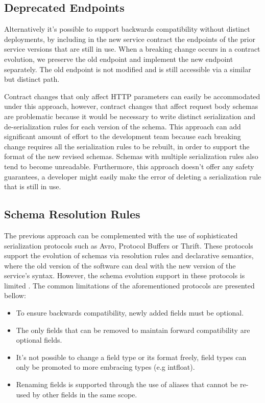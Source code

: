 \subsection{Deprecated Endpoints} %
\label{sec:deprecated_endpoints}

Alternatively it's possible to support backwards compatibility without distinct deployments,
by including in the new service contract the endpoints of the prior service versions that are still in use.
When a breaking change occurs in a contract evolution, we preserve the old endpoint and implement the new endpoint separately.
The old endpoint is not modified and is still accessible via a similar but distinct path.

Contract changes that only affect HTTP parameters can easily be accommodated under this approach, however, contract changes that affect
request body schemas are problematic because it would be necessary to write distinct serialization and de-serialization rules for each version of the schema.
This approach can add significant amount of effort to the development team because each breaking change requires all the serialization rules to be rebuilt,
in order to support the format of the new revised schemas.
Schemas with multiple serialization rules also tend to become unreadable.
Furthermore, this approach doesn't offer any safety guarantees,
a developer might easily make the error of deleting a serialization rule that is still in use.

\subsection{Schema Resolution Rules} %
\label{sec:schema_resolution_rules}

The previous approach can be complemented with the use of sophisticated serialization protocols such as Avro, Protocol Buffers or Thrift.
These protocols support the evolution of schemas via resolution rules and declarative semantics,
where the old version of the software can deal with the new version of the service’s syntax.
However, the schema evolution support in these protocols is limited \cite{11}.
The common limitations of the aforementioned protocols are presented bellow:

\begin{itemize}
    \item To ensure backwards compatibility, newly added fields must be optional.
    \item The only fields that can be removed to maintain forward compatibility are optional fields.
    \item It's not possible to change a field type or its format freely, field types can only be promoted to more embracing types (e.g int\textrightarrow float).
    \item Renaming fields is supported through the use of aliases that cannot be re-used by other fields in the same scope.
\end{itemize}

